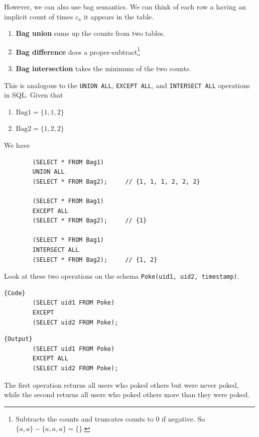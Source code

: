 \documentclass{article}
\begin{document}
    \begin{definition}
      However, we can also use bag semantics. We can think of each row $a$ having an implicit count of times $c_a$ it appears in the table.  
      \begin{enumerate}
        \item \textbf{Bag union} sums up the counts from two tables. 
        \item \textbf{Bag difference} does a proper-subtract\footnote{Subtracts the counts and truncates counts to $0$ if negative. So $\{a, a\} - \{a, a, a\} = \{\}$.} 
        \item \textbf{Bag intersection} takes the minimum of the two counts. 
      \end{enumerate}
      This is analogous to the \texttt{UNION ALL}, \texttt{EXCEPT ALL}, and \texttt{INTERSECT ALL} operations in SQL. Given that 
      \begin{enumerate}
        \item $\mathrm{Bag1} = \{1, 1, 2\}$
        \item $\mathrm{Bag2} = \{1, 2, 2\}$
      \end{enumerate}
      We have 
      \begin{lstlisting}
        (SELECT * FROM Bag1) 
        UNION ALL 
        (SELECT * FROM Bag2);     // {1, 1, 1, 2, 2, 2}

        (SELECT * FROM Bag1) 
        EXCEPT ALL 
        (SELECT * FROM Bag2);     // {1}

        (SELECT * FROM Bag1) 
        INTERSECT ALL 
        (SELECT * FROM Bag2);     // {1, 2}
      \end{lstlisting}
    \end{definition}

    \begin{example}
      Look at these two operations on the schema \texttt{Poke(uid1, uid2, timestamp)}. 

      \noindent\begin{minipage}{.5\textwidth}
      \begin{lstlisting}[]{Code}
        (SELECT uid1 FROM Poke) 
        EXCEPT 
        (SELECT uid2 FROM Poke); 
      \end{lstlisting}
      \end{minipage}
      \hfill
      \begin{minipage}{.49\textwidth}
      \begin{lstlisting}[]{Output}
        (SELECT uid1 FROM Poke) 
        EXCEPT ALL
        (SELECT uid2 FROM Poke); 
      \end{lstlisting}
      \end{minipage}
      The first operation returns all users who poked others but were never poked, while the second returns all users who poked others more than they were poked. 
    \end{example}
\end{document}
